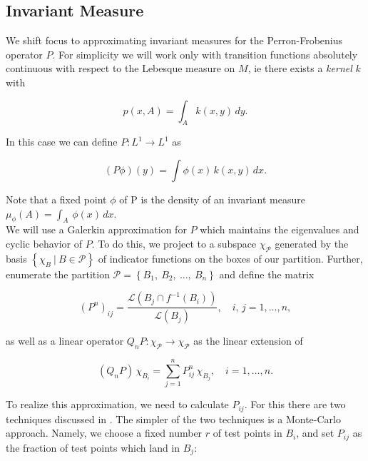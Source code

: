 
\subsection{Invariant Measure}

We shift focus to approximating invariant measures for the Perron-Frobenius operator $P$.
For simplicity we will work only with transition functions absolutely continuous with 
respect to the Lebesque measure on $M$, ie there exists a \emph{kernel} $k$ with 

\begin{equation}
    \label{eq:kernel}
    p(x, A) = \int_A k(x, y)\, dy.
\end{equation}

In this case we can define $P: L^1 \to L^1$ as 

\begin{equation}
    (P \phi)(y) = \int \phi (x)\, k(x, y)\, dx.
\end{equation}

Note that a fixed point $\phi$ of P is the density of an invariant measure 
$\mu_\phi (A) = \int_A\, \phi(x)\, dx$. \\

We will use a Galerkin approximation for $P$ which maintains the eigenvalues and cyclic 
behavior of $P$. To do this, we project to a subspace 
$\chi_{\mathcal{P}}$ generated by the basis $\left\{ \chi_B\ \vert\ B \in \mathcal{P} \right\}$ 
of indicator functions on the boxes of our partition. Further, enumerate the partition 
$\mathcal{P} = \left\{ B_1,\ B_2,\ \ldots,\ B_n \right\}$ and define the matrix 

\begin{equation}
    \label{eq:pij}
    (P^n)_{ij} = \frac{\mathcal{L}\left(B_j \cap f^{-1}(B_i)\right)}{\mathcal{L}(B_j)}, 
    \quad i,\, j = 1, \ldots, n,
\end{equation}

as well as a linear operator $Q_n P : \chi_{\mathcal{P}} \to \chi_{\mathcal{P}}$ as 
the linear extension of 

\begin{equation}
    \label{eq:qnp}
    (Q_n P)\, \chi_{B_i} = \sum_{j = 1}^n P_{ij}^n\, \chi_{B_j}, \quad i = 1, \ldots, n.
\end{equation}

To realize this approximation, we need to calculate $P_{ij}$. For this there are two 
techniques discussed in \cite*{algGAIO}. The simpler of the two techniques is a 
Monte-Carlo approach. Namely, we choose a fixed number $r$ of test points in 
$B_i$, and set $P_{ij}$ as the fraction of test points which land in $B_j$:

